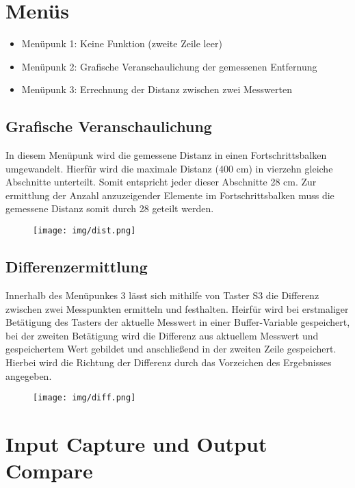 \documentclass[german]{article}
\begin{document}
\section{Menüs}

\begin{itemize}
\item Menüpunk 1: Keine Funktion (zweite Zeile leer)
\item Menüpunk 2: Grafische Veranschaulichung der gemessenen Entfernung
\item Menüpunk 3: Errechnung der Distanz zwischen zwei Messwerten
\end{itemize}

\subsection{Grafische Veranschaulichung}

In diesem Menüpunk wird die gemessene Distanz in einen Fortschrittsbalken umgewandelt. Hierfür wird die maximale Distanz (400 cm) in vierzehn gleiche Abschnitte unterteilt. Somit entspricht jeder dieser Abschnitte 28 cm. Zur ermittlung der Anzahl anzuzeigender Elemente im Fortschrittsbalken muss die gemessene Distanz somit durch 28 geteilt werden.
\begin{figure}[H]\centering\texttt{[image: img/dist.png]}\end{figure}

\subsection{Differenzermittlung}

Innerhalb des Menüpunkes 3 lässt sich mithilfe von Taster S3 die Differenz zwischen zwei Messpunkten ermitteln und festhalten. Heirfür wird bei erstmaliger Betätigung des Tasters der aktuelle Messwert in einer Buffer-Variable gespeichert, bei der zweiten Betätigung wird die Differenz aus aktuellem Messwert und gespeichertem Wert gebildet und anschließend in der zweiten Zeile gespeichert. Hierbei wird die Richtung der Differenz durch das Vorzeichen des Ergebnisses angegeben.
\begin{figure}[H]\centering\texttt{[image: img/diff.png]}\end{figure}

\section{Input Capture und Output Compare}

\subsection{}

\subsection{}
\end{document}
